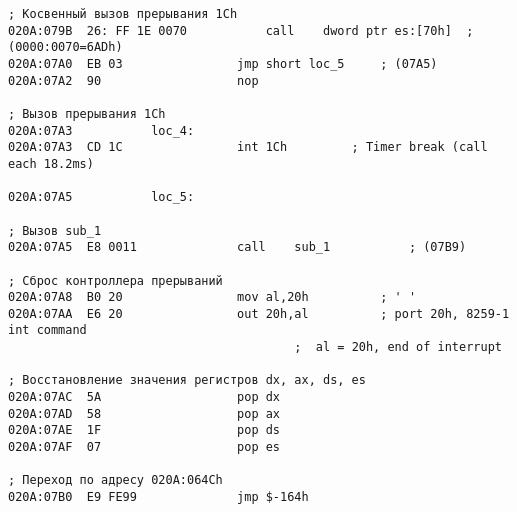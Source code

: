 \begin{center}
\begin{lstlisting}[style={asm}, caption = Прерывание int 8h]
; Косвенный вызов прерывания 1Ch
020A:079B  26: FF 1E 0070			call	dword ptr es:[70h]	; (0000:0070=6ADh)
020A:07A0  EB 03				jmp	short loc_5		; (07A5)
020A:07A2  90					nop

; Вызов прерывания 1Ch
020A:07A3			loc_4:
020A:07A3  CD 1C				int	1Ch			; Timer break (call each 18.2ms)

020A:07A5			loc_5:

; Вызов sub_1
020A:07A5  E8 0011				call	sub_1			; (07B9)

; Сброс контроллера прерываний
020A:07A8  B0 20				mov	al,20h			; ' '
020A:07AA  E6 20				out	20h,al			; port 20h, 8259-1 int command
										;  al = 20h, end of interrupt
										
; Восстановление значения регистров dx, ax, ds, es
020A:07AC  5A					pop	dx
020A:07AD  58					pop	ax
020A:07AE  1F					pop	ds
020A:07AF  07					pop	es

; Переход по адресу 020A:064Ch
020A:07B0  E9 FE99				jmp	$-164h
\end{lstlisting}


%
\end{center}